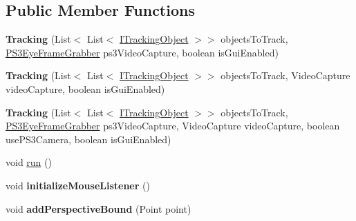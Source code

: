 \subsection*{Public Member Functions}
\begin{DoxyCompactItemize}
\item 
\hypertarget{classairhockeyjava_1_1detection_1_1_tracking_afccc9d86620a14d9823a9afb35cc42fa}{}{\bfseries Tracking} (List$<$ List$<$ \hyperlink{interfaceairhockeyjava_1_1detection_1_1_i_tracking_object}{I\+Tracking\+Object} $>$$>$ objects\+To\+Track, \hyperlink{classairhockeyjava_1_1detection_1_1_p_s3_eye_frame_grabber}{P\+S3\+Eye\+Frame\+Grabber} ps3\+Video\+Capture, boolean is\+Gui\+Enabled)\label{classairhockeyjava_1_1detection_1_1_tracking_afccc9d86620a14d9823a9afb35cc42fa}

\item 
\hypertarget{classairhockeyjava_1_1detection_1_1_tracking_ade00b9a05021d06cb5e8b39c22132312}{}{\bfseries Tracking} (List$<$ List$<$ \hyperlink{interfaceairhockeyjava_1_1detection_1_1_i_tracking_object}{I\+Tracking\+Object} $>$$>$ objects\+To\+Track, Video\+Capture video\+Capture, boolean is\+Gui\+Enabled)\label{classairhockeyjava_1_1detection_1_1_tracking_ade00b9a05021d06cb5e8b39c22132312}

\item 
\hypertarget{classairhockeyjava_1_1detection_1_1_tracking_a3597031ca1c515708e44c6fa1fd93846}{}{\bfseries Tracking} (List$<$ List$<$ \hyperlink{interfaceairhockeyjava_1_1detection_1_1_i_tracking_object}{I\+Tracking\+Object} $>$$>$ objects\+To\+Track, \hyperlink{classairhockeyjava_1_1detection_1_1_p_s3_eye_frame_grabber}{P\+S3\+Eye\+Frame\+Grabber} ps3\+Video\+Capture, Video\+Capture video\+Capture, boolean use\+P\+S3\+Camera, boolean is\+Gui\+Enabled)\label{classairhockeyjava_1_1detection_1_1_tracking_a3597031ca1c515708e44c6fa1fd93846}

\item 
void \hyperlink{classairhockeyjava_1_1detection_1_1_tracking_aab7fd2623706d2b5820927c2e1814f22}{run} ()
\item 
\hypertarget{classairhockeyjava_1_1detection_1_1_tracking_abec433c7137ec11375017935808c29f2}{}void {\bfseries initialize\+Mouse\+Listener} ()\label{classairhockeyjava_1_1detection_1_1_tracking_abec433c7137ec11375017935808c29f2}

\item 
\hypertarget{classairhockeyjava_1_1detection_1_1_tracking_a3fcd72d41d5e9d8b98b7c378a687267b}{}void {\bfseries add\+Perspective\+Bound} (Point point)\label{classairhockeyjava_1_1detection_1_1_tracking_a3fcd72d41d5e9d8b98b7c378a687267b}


\end{DoxyCompactItemize}
